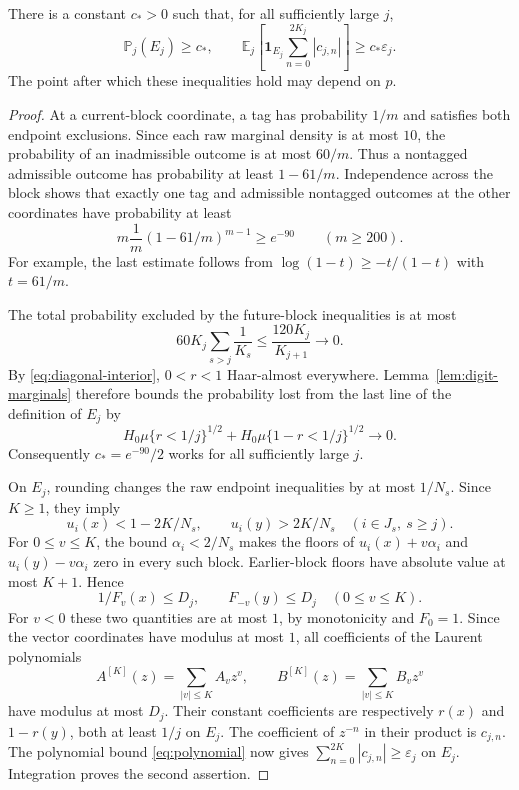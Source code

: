 \begin{lemma}\label{lem:truncation-bound}
There is a constant $c_*>0$ such that, for all sufficiently large $j$,
\begin{equation}\label{eq:finite-lower-bound}
 \mathbb P_j(E_j)\ge c_*,\qquad
 \mathbb E_j\left[\mathbf 1_{E_j}
          \sum_{n=0}^{2K_j}|c_{j,n}|\right]\ge c_*\varepsilon_j.
\end{equation}
The point after which these inequalities hold may depend on $p$.
\end{lemma}

\begin{proof}
At a current-block coordinate, a tag has probability $1/m$ and
satisfies both endpoint exclusions. Since each raw marginal density is
at most $10$, the probability of an inadmissible outcome is at most
$60/m$. Thus a nontagged admissible outcome has probability at least
$1-61/m$. Independence across the block shows that exactly one tag and
admissible nontagged outcomes at the other coordinates have probability
at least
\[
 m\frac1m(1-61/m)^{m-1}\ge e^{-90}\qquad(m\ge200).
\]
For example, the last estimate follows from
$\log(1-t)\ge-t/(1-t)$ with $t=61/m$.

The total probability excluded by the future-block inequalities is at
most
\[
 60K_j\sum_{s>j}\frac1{K_s}
 \le\frac{120K_j}{K_{j+1}}\longrightarrow0.
\]
By \eqref{eq:diagonal-interior}, $0<r<1$ Haar-almost everywhere.
Lemma~\ref{lem:digit-marginals} therefore bounds the probability lost
from the last line of the definition of $E_j$ by
\[
 H_0\mu\{r<1/j\}^{1/2}
 +H_0\mu\{1-r<1/j\}^{1/2}\longrightarrow0.
\]
Consequently $c_*=e^{-90}/2$ works for all sufficiently large $j$.

On $E_j$, rounding changes the raw endpoint inequalities by at most
$1/N_s$. Since $K\ge1$, they imply
\[
 u_i(x)<1-2K/N_s,\qquad u_i(y)>2K/N_s
       \quad(i\in J_s,\ s\ge j).
\]
For $0\le v\le K$, the bound $\alpha_i<2/N_s$ makes the floors of
$u_i(x)+v\alpha_i$ and $u_i(y)-v\alpha_i$ zero in every such block.
Earlier-block floors have absolute value at most $K+1$. Hence
\[
 1/F_v(x)\le D_j,
 \qquad F_{-v}(y)\le D_j\quad(0\le v\le K).
\]
For $v<0$ these two quantities are at most $1$, by monotonicity and
$F_0=1$. Since the vector coordinates have modulus at most $1$, all
coefficients of the Laurent polynomials
\[
 A^{[K]}(z)=\sum_{|v|\le K}A_vz^v,
 \qquad B^{[K]}(z)=\sum_{|v|\le K}B_vz^v
\]
have modulus at most $D_j$. Their constant coefficients are respectively
$r(x)$ and $1-r(y)$, both at least $1/j$ on $E_j$. The coefficient of
$z^{-n}$ in their product is $c_{j,n}$. The polynomial bound
\eqref{eq:polynomial} now gives
$\sum_{n=0}^{2K}|c_{j,n}|\ge\varepsilon_j$ on $E_j$.
Integration proves the second assertion.
\end{proof}


